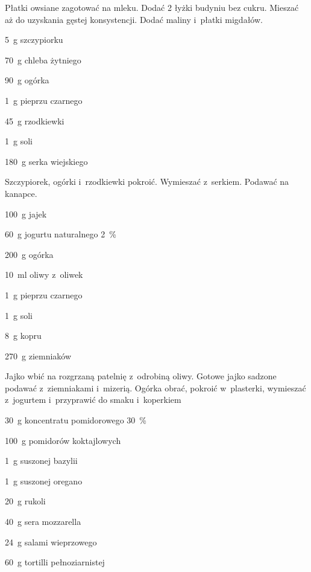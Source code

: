 \documentclass[../main.tex]{subfiles}
\begin{document}
Płatki owsiane zagotować na mleku. Dodać \num{2} łyżki budyniu bez cukru.
Mieszać aż do uzyskania gęstej konsystencji. Dodać maliny i~płatki migdałów.


\begin{Ingred}
    \item \qty{5}{\gram} szczypiorku
    \item \qty{70}{\gram} chleba żytniego
    \item \qty{90}{\gram} ogórka
    \item \qty{1}{\gram} pieprzu czarnego
    \item \qty{45}{\gram} rzodkiewki
    \item \qty{1}{\gram} soli
    \item \qty{180}{\gram} serka wiejskiego
\end{Ingred}

Szczypiorek, ogórki i~rzodkiewki pokroić. Wymieszać z~serkiem. Podawać na
kanapce.


\begin{Ingred}
    \item \qty{100}{\gram} jajek
    \item \qty{60}{\gram} jogurtu naturalnego \qty{2}{\percent}
    \item \qty{200}{\gram} ogórka
    \item \qty{10}{\milli\litre} oliwy z~oliwek
    \item \qty{1}{\gram} pieprzu czarnego
    \item \qty{1}{\gram} soli
    \item \qty{8}{\gram} kopru
    \item \qty{270}{\gram} ziemniaków
\end{Ingred}

Jajko wbić na rozgrzaną patelnię z~odrobiną oliwy. Gotowe jajko sadzone podawać
z~ziemniakami i~mizerią. Ogórka obrać, pokroić w~plasterki, wymieszać
z~jogurtem i~przyprawić do smaku i~koperkiem


\begin{Ingred}
    \item \qty{30}{\gram} koncentratu pomidorowego \qty{30}{\percent}
    \item \qty{100}{\gram} pomidorów koktajlowych
    \item \qty{1}{\gram} suszonej bazylii
    \item \qty{1}{\gram} suszonej oregano
    \item \qty{20}{\gram} rukoli
    \item \qty{40}{\gram} sera mozzarella
    \item \qty{24}{\gram} salami wieprzowego
    \item \qty{60}{\gram} tortilli pełnoziarnistej
\end{Ingred}
\end{document}
